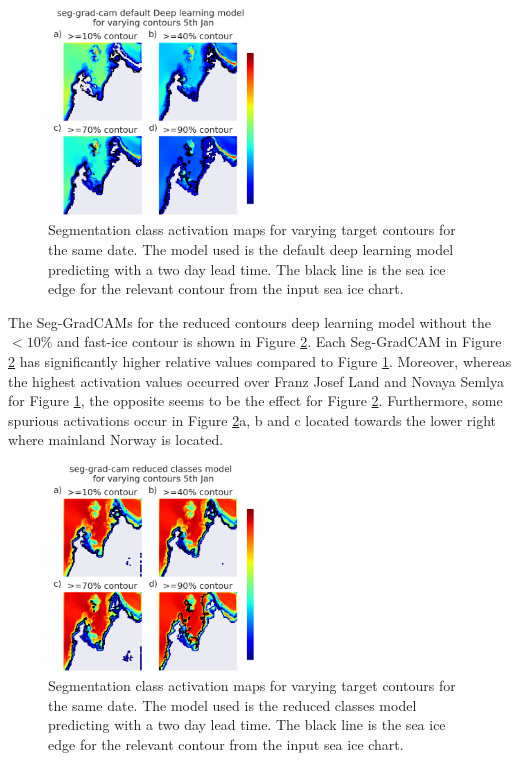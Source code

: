 \documentclass[../main/thesis.tex]{subfiles}
\begin{document}
\begin{figure}
    \centering
    \includegraphics[width=0.49\textwidth]{baseline_contours}
    \caption{\label{fig:seg_base_cont}Segmentation class activation maps for varying target contours for the same date. The model used is the default deep learning model predicting with a two day lead time. The black line is the sea ice edge for the relevant contour from the input sea ice chart.}
\end{figure}

The Seg-GradCAMs for the reduced contours deep learning model without the $<10\%$ and fast-ice contour is shown in Figure \ref{fig:seg_red_cont}. Each Seg-GradCAM in Figure \ref{fig:seg_red_cont} has significantly higher relative values compared to Figure \ref{fig:seg_base_cont}. Moreover, whereas the highest activation values occurred over Franz Josef Land and Novaya Semlya for Figure \ref{fig:seg_base_cont}, the opposite seems to be the effect for Figure \ref{fig:seg_red_cont}. Furthermore, some spurious activations occur in Figure \ref{fig:seg_red_cont}a, b and c located towards the lower right where mainland Norway is located.

\begin{figure}
    \centering
    \includegraphics[width=0.49\textwidth]{reduced_classes_contours}
    \caption{\label{fig:seg_red_cont}Segmentation class activation maps for varying target contours for the same date. The model used is the reduced classes model predicting with a two day lead time. The black line is the sea ice edge for the relevant contour from the input sea ice chart.}
\end{figure}
\end{document}

